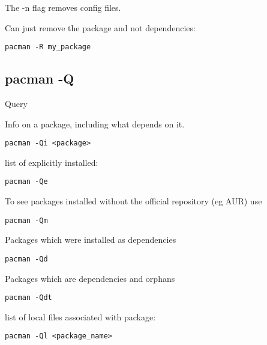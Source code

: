 The -n flag removes config files.

Can just remove the package and not dependencies:

\begin{verbatim}
pacman -R my_package
\end{verbatim}



\subsection{pacman -Q}

Query

Info on a package, including what depends on it.
\begin{verbatim}
pacman -Qi <package>
\end{verbatim}


list of explicitly installed:
\begin{verbatim}
pacman -Qe
\end{verbatim}
To see packages installed without the official repository (eg AUR) use
\begin{verbatim}
pacman -Qm
\end{verbatim}

Packages which were installed as dependencies
\begin{verbatim}
pacman -Qd
\end{verbatim}

Packages which are dependencies and orphans
\begin{verbatim}
pacman -Qdt
\end{verbatim}

list of local files associated with package:
\begin{verbatim}
pacman -Ql <package_name>
\end{verbatim}

